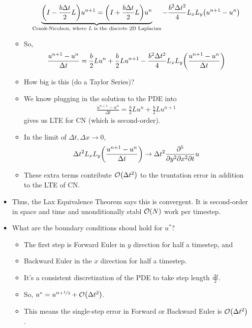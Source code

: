 \documentclass{article}
\newcommand{\half}{\nicefrac{1}{2}}
\newcommand{\Dx}{\Delta x}
\newcommand{\Dt}{\Delta t}
\begin{document}
\begin{itemize}
\begin{itemize}
                \begin{align}
                    \underbrace{\qty(I - \frac{b\Dt}{2}L)u^{n+1} = \qty(I + \frac{b\Dt}{2}L)u^n}_\text{Crank-Nicolson, where $L$ is the discrete 2D Laplacian} - \frac{b^2\Dt^2}{4}L_xL_y\qty(u^{n+1} - u^n)
                \end{align}
                \item So,
                \begin{align}
                    \frac{u^{n+1} - u^n}{\Dt} = \frac{b}{2}Lu^n + \frac{b}{2}Lu^{n+1} - \frac{b^2\Dt^2}{4}L_xL_y\qty(\frac{u^{n+1} - u^n}{\Dt})
                \end{align}
                \item How big is this (do a Taylor Series)?
                \item We know plugging in the solution to the PDE into
                \begin{align}
                    \frac{u^{n+1} - u^n}{\Dt} = \frac{b}{2}Lu^n + \frac{b}{2}Lu^{n+1}
                \end{align}
                gives us LTE for CN (which is second-order).
                \item In the limit of $\Dt,\Dx \rightarrow 0$,
                \begin{align}
                    \Dt^2L_xL_y\qty(\frac{u^{n+1} - u^n}{\Dt}) \rightarrow \Dt^2\frac{\partial^5}{\partial y^2\partial x^2 \partial t}u
                \end{align}
                \item These extra terms contribute $\order{\Dt^2}$ to the truntation error in addition to the LTE of CN.
            \end{itemize}
            \item Thus, the Lax Equivalence Theorem says this is convergent.  It is second-order in space and time and unonditionally stabl $\order{N}$ work per timestep.
            \item What are the boundary conditions shoud hold for $u^*$?
            \begin{itemize}
                \item The first step is Forward Euler in $y$ direction for half a timestep, and
                \item Backward Euler in the $x$ direction for half a timestep.
                \item It's a consistent discretization of the PDE to take step length $\frac{\Dt}{2}$.
                \item So, $u^* = u^{n+\half} + \order{\Dt^2}$.
                \item This means the single-step error in Forward or Backward Euler is $\order{\Dt^2}$.
            \end{itemize}
        \end{itemize}
\end{document}
